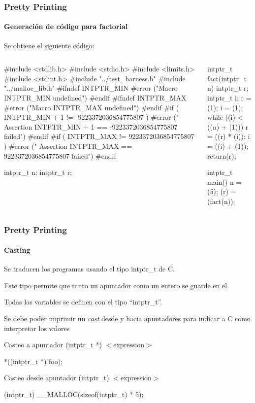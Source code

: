 \begin{frame}[fragile]
\frametitle{Pretty Printing}
\framesubtitle{Generación de código para factorial}
\Fontvi

Se obtiene el siguiente código:

\begin{columns}[t]
\begin{semiverbatim}
\alert<2>{#include <stdlib.h>}
\alert<2>{#include <stdio.h>}
\alert<2>{#include <limits.h>}
\alert<2>{#include <stdint.h>}
\alert<2>{#include "../test_harness.h"}
\alert<2>{#include "../malloc_lib.h"}
\alert<3>{#ifndef INTPTR_MIN}
  \alert<3>{#error ("Macro INTPTR_MIN undefined")}
\alert<3>{#endif}
\alert<3>{#ifndef INTPTR_MAX}
  \alert<3>{#error ("Macro INTPTR_MAX undefined")}
\alert<3>{#endif}
\alert<3>{#if ( INTPTR_MIN + 1 != -9223372036854775807 )}
  \alert<3>{#error (" Assertion INTPTR_MIN + 1 == -9223372036854775807 failed")}
\alert<3>{#endif}
\alert<3>{#if ( INTPTR_MAX != 9223372036854775807 )}
  \alert<3>{#error (" Assertion INTPTR_MAX == 9223372036854775807 failed")}
\alert<3>{#endif}


\alert<4>{intptr_t n;}
\alert<4>{intptr_t r;}
\end{semiverbatim}
\begin{semiverbatim}
\alert<5>{intptr_t fact(intptr_t n) {}
\alert<5>{  intptr_t r;}
\alert<5>{  intptr_t i;}
\alert<5>{  r = (1);}
\alert<5>{  i = (1);}
\alert<5>{  while ((i) < ((n) + (1))) {}
\alert<5>{    r = ((r) * (i));}
\alert<5>{    i = ((i) + (1));}
\alert<5>{  }}
\alert<5>{  return(r);}
\alert<5>{}}

\alert<6>{intptr_t main() {}
\alert<6>{  n = (5);}
\alert<6>{  (r) = (fact(n));}
\alert<6>{}}
\end{semiverbatim}
\end{columns}


\end{frame}


\begin{frame}
\frametitle{Pretty Printing}
\framesubtitle{Casting}

Se traducen los programas usando el tipo intptr\_t de C.
\bigskip

Este tipo permite que tanto un apuntador como un entero se guarde en el.

Todas las variables se definen con el tipo ``intptr\_t''.

\bigskip

Se debe poder imprimir un \textit{cast} desde y hacia apuntadores para indicar a C como interpretar los valores

\bigskip
\pause

\begin{block}{Casteo a apuntador}
(intptr\_t *) $<$expression$>$

*((intptr\_t *) foo);
\end{block}

\begin{block}{Casteo desde apuntador}
(intptr\_t) $<$expression$>$

(intptr\_t) \_\_MALLOC(sizeof(intptr\_t) * 5);
\end{block}


\end{frame}



